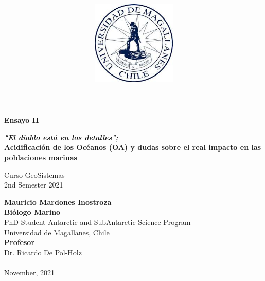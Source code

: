 \documentclass[
]{article}
\title{\includegraphics[width=4cm,height=\textheight]{logoUMAG.jpg}}
\author{}
\date{\vspace{-2.5em}}
\begin{document}
\maketitle



\begin{flushleft}
\Large{\textbf{Ensayo II}}\\
\vspace*{2\baselineskip}
\begin{center}
\LARGE{\textbf{\textit{"El diablo está en los detalles";}}}\\
\LARGE{\textbf{Acidificación de los Océanos (OA) y dudas sobre el real impacto en las poblaciones marinas}}\\
\end{center}
\vspace*{3\baselineskip}
\Large{Curso GeoSistemas}\\
\vspace*{1\baselineskip}
\Large{2nd Semester 2021 }\\
\vspace*{3\baselineskip}
\end{flushleft}
\begin{flushright}
\large{\textbf{Mauricio Mardones Inostroza}}\\
\large{\textbf{Biólogo Marino}}\\
\vspace*{2\baselineskip}
\normalsize{PhD Student Antarctic and SubAntarctic Science Program}\\
\vspace*{1\baselineskip}
\normalsize{Universidad de Magallanes, Chile}\\
\vspace*{1\baselineskip}
\normalsize{\textbf{Profesor}}\\
Dr. Ricardo De Pol-Holz\\
\vspace*{1\baselineskip}
\normalsize{\textbf{}}\\
November, 2021
\end{flushright}



\hypersetup{linkcolor = black}
\newpage
{}

\newpage
\end{document}

